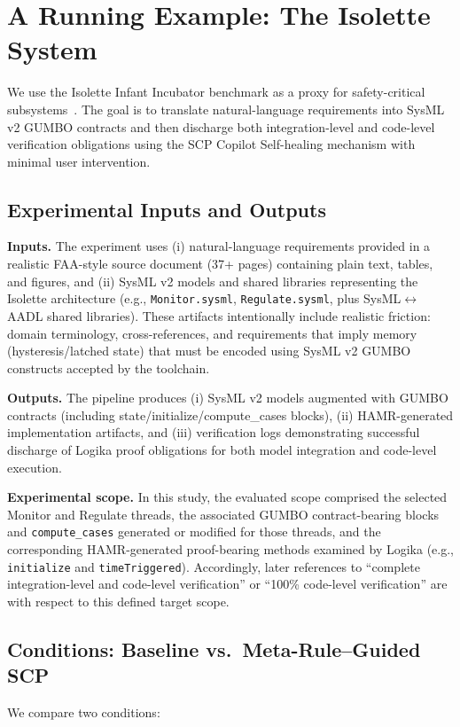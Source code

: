 \documentclass[conference]{IEEEtran}
\begin{document}
\section{A Running Example: The Isolette System}
\label{sec:example}

We use the Isolette Infant Incubator benchmark as a proxy for safety-critical subsystems~\cite{hatcliff2024isolette}. The goal is to translate natural-language requirements into SysML v2 GUMBO contracts and then discharge both integration-level and code-level verification obligations using the SCP Copilot Self-healing mechanism with minimal user intervention.

\subsection{Experimental Inputs and Outputs}
\textbf{Inputs.} The experiment uses (i) natural-language requirements provided in a realistic FAA-style source document (37+ pages) containing plain text, tables, and figures, and (ii) SysML v2 models and shared libraries representing the Isolette architecture (e.g., \texttt{Monitor.sysml}, \texttt{Regulate.sysml}, plus SysML$\leftrightarrow$AADL shared libraries). These artifacts intentionally include realistic friction: domain terminology, cross-references, and requirements that imply memory (hysteresis/latched state) that must be encoded using SysML v2 GUMBO constructs accepted by the toolchain.

\textbf{Outputs.} The pipeline produces (i) SysML v2 models augmented with GUMBO contracts (including state/initialize/compute\_cases blocks), (ii) HAMR-generated implementation artifacts, and (iii) verification logs demonstrating successful discharge of Logika proof obligations for both model integration and code-level execution.

\textbf{Experimental scope.} In this study, the evaluated scope comprised the selected Monitor and Regulate threads, the associated GUMBO contract-bearing blocks and \texttt{compute\_cases} generated or modified for those threads, and the corresponding HAMR-generated proof-bearing methods examined by Logika (e.g., \texttt{initialize} and \texttt{timeTriggered}). Accordingly, later references to ``complete integration-level and code-level verification'' or ``100\% code-level verification'' are with respect to this defined target scope.

\subsection{Conditions: Baseline vs.\ Meta-Rule--Guided SCP}
We compare two conditions:
\end{document}
